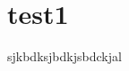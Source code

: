 \documentclass[a4paper,12pt,french]{report}
\begin{document}
\section{test1}

sjkbdksjbdkjsbdckjal
\end{document}
